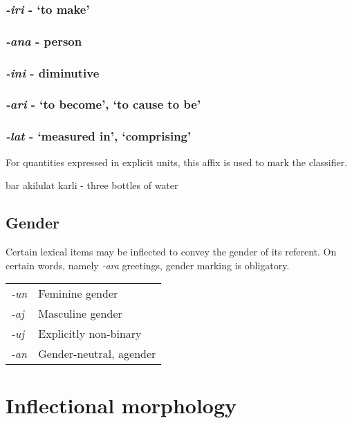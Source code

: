 \documentclass[a4paper,10pt,twoside,openright]{memoir}
\begin{document}
\subsubsection{\emph{-iri} - `to make'}

\subsubsection{\emph{-ana} - person}

\subsubsection{\emph{-ini} - diminutive}

\subsubsection{\emph{-ari} - `to become', `to cause to be'}

\subsubsection{\emph{-lat} - `measured in', `comprising'}

For quantities expressed in explicit units, this affix is used to mark the classifier.

bar akilulat karli - three bottles of water

\subsection{Gender}

Certain lexical items may be inflected to convey the gender of its referent. On certain words, namely \emph{-ara} greetings, gender marking is obligatory.

\begin{table}[ht]
    \centering
    \begin{tabular}{>{\em}ll}
    -un & Feminine gender \\
    -aj & Masculine gender \\
    -uj & Explicitly non-binary \\
    -an & Gender-neutral, agender \\
    \end{tabular}
\end{table}



\section{Inflectional morphology}
\end{document}
